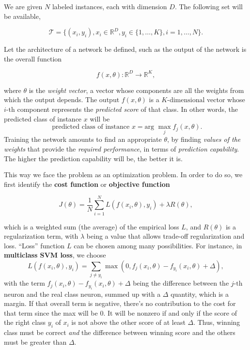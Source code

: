 \documentclass[10pt]{report}
\begin{document}
We are given \(N\) labeled instances, each with dimension \(D\). The
following set will be available,

\[\mathcal{T} = \{(x_i, y_i), x_i \in \mathbb{R}^D, y_i \in \{1, \dots, K\}, i = 1, \dots, N \}.\]

Let the architecture of a network be defined, such as the output of the
network is the overall function

\[f(x, \theta) : \mathbb{R}^D \rightarrow \mathbb{R}^K,\]

where \(\theta\) is the \emph{weight vector}, a vector whose components are
all the weights from which the output depends. The output
\(f(x, \theta)\) is a \(K\mbox{-dimensional}\) vector whose
\(i\mbox{-th}\) component represents the \emph{predicted score} of that
class. In other words, the predicted class of instance \(x\) will be
\[ \mbox{ predicted class of instance } x = \mbox{arg } \max_{j} f_j(x, \theta). \]
Training the network amounts to find an appropriate \(\theta\), by
finding \emph{values of the weights} that provide the \emph{required performance},
in terms of \emph{prediction capability}. The higher the prediction
capability will be, the better it is.

This way we face the problem as an optimization problem. In order to do
so, we first identify the \textbf{cost function} or \textbf{objective function}

\[J(\theta) = \frac{1}{N} \sum_{i=1}^{N} L(f(x_i, \theta), y_i) + \lambda R(\theta),\]

which is a weighted sum (the average) of the empirical loss \(L\), and
\(R(\theta)\) is a regularization term, with \(\lambda\) being a value
that allows trade-off regularization and loss. ``Loss'' function \(L\)
can be chosen among many possibilities. For instance, in \textbf{multiclass SVM
loss}, we choose
\[L(f(x_i, \theta), y_i) = \sum_{j \neq y_i} \max{(0, f_j(x_i, \theta) - f_{y_i}(x_i, \theta) + \Delta)},\]
with the term \(f_j(x_i, \theta) - f_{y_i}(x_i, \theta) + \Delta\)
being the difference between the \(j\mbox{-th}\) neuron and the real
class neuron, summed up with a \(\Delta\) quantity, which is a margin.
If that overall term is negative, there's no contribution to the cost
for that term since the max will be \(0\). It will be nonzero if and
only if the score of the right class \(y_i\) of \(x_i\) is not above the
other score of at least \(\Delta\). Thus, winning class must be correct
\emph{and} the difference between winning score and the others must be
greater than \(\Delta\).
\end{document}
